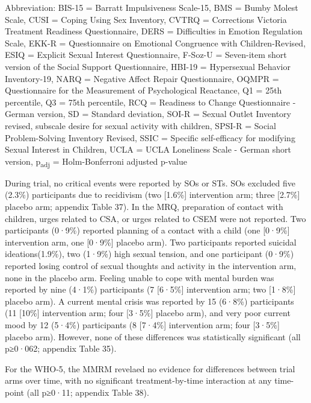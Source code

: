 \documentclass[
  super,
  preprint,
  1p,
  onecolumn]{elsarticle}
\begin{document}
\begin{table}
{\begin{minipage}{\linewidth}
\parbox{\linewidth}{\raggedright {Abbreviation: BIS-15 = Barratt Impulsiveness Scale-15, BMS = Bumby Molest Scale, CUSI = Coping Using Sex Inventory, CVTRQ = Corrections Victoria Treatment Readiness Questionnaire, DERS = Difficulties in Emotion Regulation Scale, EKK-R = Questionnaire on Emotional Congruence with Children-Revised, ESIQ = Explicit Sexual Interest Questionnaire, F-Soz-U = Seven-item short version of the Social Support Questionnaire, HBI-19 = Hypersexual Behavior Inventory-19, NARQ = Negative Affect Repair Questionnaire, OQMPR = Questionnaire for the Measurement of Psychological Reactance, Q1 = 25th percentile, Q3 = 75th percentile, RCQ = Readiness to Change Questionnaire - German version, SD = Standard deviation, SOI-R = Sexual Outlet Inventory revised, subscale desire for sexual activity with children, SPSI-R = Social Problem-Solving Inventory Revised, SSIC = Specific self-efficacy for modifying Sexual Interest in Children, UCLA = UCLA Loneliness Scale - German short version, p\textsubscript{adj} = Holm-Bonferroni adjusted p-value\\
}}\end{minipage}

}

\end{table}%

\newpage{}

During trial, no critical events were reported by SOs or STs. SOs
excluded five (2.3\%) participants due to recidivism (two {[}1.6\%{]}
intervention arm; three {[}2.7\%{]} placebo arm; appendix Table 37). In
the MRQ, preparation of contact with children, urges related to CSA, or
urges related to CSEM were not reported. Two participants (0·9\%)
reported planning of a contact with a child (one {[}0·9\%{]}
intervention arm, one {[}0·9\%{]} placebo arm). Two participants
reported suicidal ideations(1.9\%), two (1·9\%) high sexual tension, and
one participant (0·9\%) reported losing control of sexual thoughts and
activity in the intervention arm, none in the placebo arm. Feeling
unable to cope with mental burden was reported by nine (4·1\%)
participants (7 {[}6·5\%{]} intervention arm; two {[}1·8\%{]} placebo
arm). A current mental crisis was reported by 15 (6·8\%) participants
(11 {[}10\%{]} intervention arm; four {[}3·5\%{]} placebo arm), and very
poor current mood by 12 (5·4\%) participants (8 {[}7·4\%{]} intervention
arm; four {[}3·5\%{]} placebo arm). However, none of these differences
was statistically significant (all p≥0·062; appendix Table 35).

For the WHO‑5, the MMRM revelaed no evidence for differences between
trial arms over time, with no significant treatment-by-time interaction
at any time-point (all p≥0·11; appendix Table 38).
\end{document}
